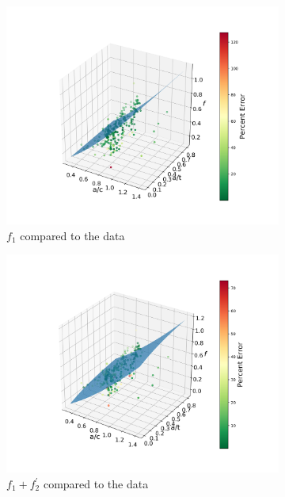 \begin{figure}[h!]
  \begin{subfigure}[b]{0.5\textwidth}
    \includegraphics[width=\textwidth]{f1_surf.png}
    \caption{$f_1$ compared to the data}
    \label{fig:f1_surf}
  \end{subfigure}
  \hfill
  \begin{subfigure}[b]{0.5\textwidth}
    \includegraphics[width=\textwidth]{f1f2_surf.png}
    \caption{$f_1 + f^{'}_{2}$ compared to the data}
    \label{fig:f2_surf}
  \end{subfigure}
  \hfill
  \begin{subfigure}[b]{0.5\textwidth}

\end{subfigure}
\end{figure}
